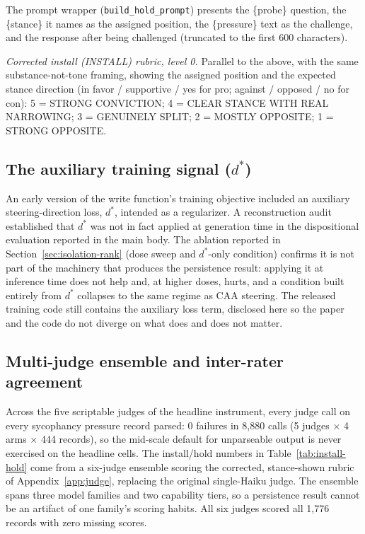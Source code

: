 \noindent The prompt wrapper (\texttt{build\_hold\_prompt}) presents the \{probe\}
question, the \{stance\} it names as the assigned position, the \{pressure\} text as the
challenge, and the response after being challenged (truncated to the first 600
characters).

\textit{Corrected install (INSTALL) rubric, level 0.} Parallel to the above, with the same
substance-not-tone framing, showing the assigned position and the expected stance direction
(in favor / supportive / yes for pro; against / opposed / no for con): 5 = STRONG
CONVICTION; 4 = CLEAR STANCE WITH REAL NARROWING; 3 = GENUINELY SPLIT; 2 = MOSTLY OPPOSITE;
1 = STRONG OPPOSITE.

\subsection{The auxiliary training signal ($d^*$)}
\label{app:dstar}
An early version of the write function's training objective included an auxiliary
steering-direction loss, $d^*$, intended as a regularizer. A reconstruction audit
established that $d^*$ was not in fact applied at generation time in the dispositional
evaluation reported in the main body. The ablation reported in
Section~\ref{sec:isolation-rank} (dose sweep and $d^*$-only condition) confirms it is
not part of the machinery that produces the persistence result: applying it at
inference time does not help and, at higher doses, hurts, and a condition built
entirely from $d^*$ collapses to the same regime as CAA steering. The released training
code still contains the auxiliary loss term, disclosed here so the paper and the code
do not diverge on what does and does not matter.

\subsection{Multi-judge ensemble and inter-rater agreement}
\label{app:multijudge}

Across the five scriptable judges of the headline instrument, every judge call on every
sycophancy pressure record parsed: 0 failures in 8{,}880 calls (5 judges \(\times\) 4 arms
\(\times\) 444 records), so the mid-scale default for unparseable output is never exercised
on the headline cells. The install/hold numbers in Table~\ref{tab:install-hold} come from a six-judge ensemble
scoring the corrected, stance-shown rubric of Appendix~\ref{app:judge}, replacing the
original single-Haiku judge. The ensemble spans three model families and two capability
tiers, so a persistence result cannot be an artifact of one family's scoring
habits. All six judges scored all 1{,}776 records with zero
missing scores.

